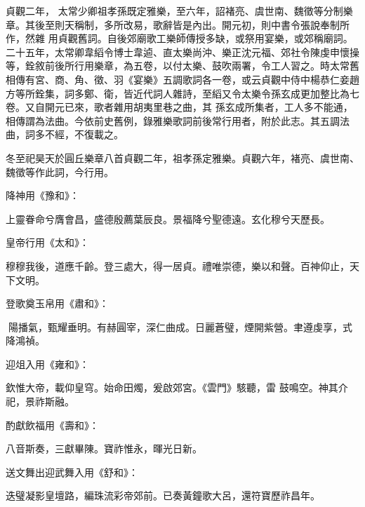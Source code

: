 
\begin{pinyinscope}

 貞觀二年，
 太常少卿祖孝孫既定雅樂，至六年，詔褚亮、虞世南、魏徵等分制樂章。其後至則天稱制，多所改易，歌辭皆是內出。開元初，則中書令張說奉制所作，然雜
 用貞觀舊詞。自後郊廟歌工樂師傳授多缺，或祭用宴樂，或郊稱廟詞。二十五年，太常卿韋縚令博士韋逌、直太樂尚沖、樂正沈元福、郊社令陳虔申懷操等，銓敘前後所行用樂章，為五卷，以付太樂、鼓吹兩署，令工人習之。時太常舊相傳有宮、商、角、徵、羽《宴樂》五調歌詞各一卷，或云貞觀中侍中楊恭仁妾趙方等所銓集，詞多鄭、衛，皆近代詞人雜詩，至縚又令太樂令孫玄成更加整比為七卷。又自開元已來，歌者雜用胡夷里巷之曲，其
 孫玄成所集者，工人多不能通，相傳謂為法曲。今依前史舊例，錄雅樂歌詞前後常行用者，附於此志。其五調法曲，詞多不經，不復載之。



 冬至祀昊天於圓丘樂章八首貞觀二年，祖孝孫定雅樂。貞觀六年，褚亮、虞世南、魏徵等作此詞，今行用。



 降神用《豫和》：



 上靈眷命兮膺會昌，盛德殷薦葉辰良。景福降兮聖德遠。玄化穆兮天歷長。



 皇帝行用《太和》：



 穆穆我後，道應千齡。登三處大，得一居貞。禮唯崇德，樂以和聲。百神仰止，天下文明。



 登歌奠玉帛用《肅和》：



 陽播氣，甄耀垂明。有赫圓宰，深仁曲成。日麗蒼璧，煙開紫營。聿遵虔享，式降鴻禎。



 迎俎入用《雍和》：



 欽惟大帝，載仰皇穹。始命田燭，爰啟郊宮。《雲門》駭聽，雷
 鼓鳴空。神其介祀，景祚斯融。



 酌獻飲福用《壽和》：



 八音斯奏，三獻畢陳。寶祚惟永，暉光日新。



 送文舞出迎武舞入用《舒和》：



 迭璧凝影皇壇路，編珠流彩帝郊前。已奏黃鐘歌大呂，還符寶歷祚昌年。




\end{pinyinscope}
